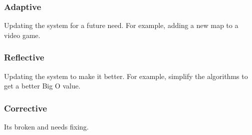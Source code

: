 \documentclass[a4paper,11pt, twocolumn]{article}
\begin{document}
\subsubsection*{Adaptive}
Updating the system for a future need. For example, adding a new map to a video game.
\subsubsection*{Reflective}
Updating the system to make it better. For example, simplify the algorithms to get a better Big O value.
\subsubsection*{Corrective}
Its broken and needs fixing.
\end{document}
